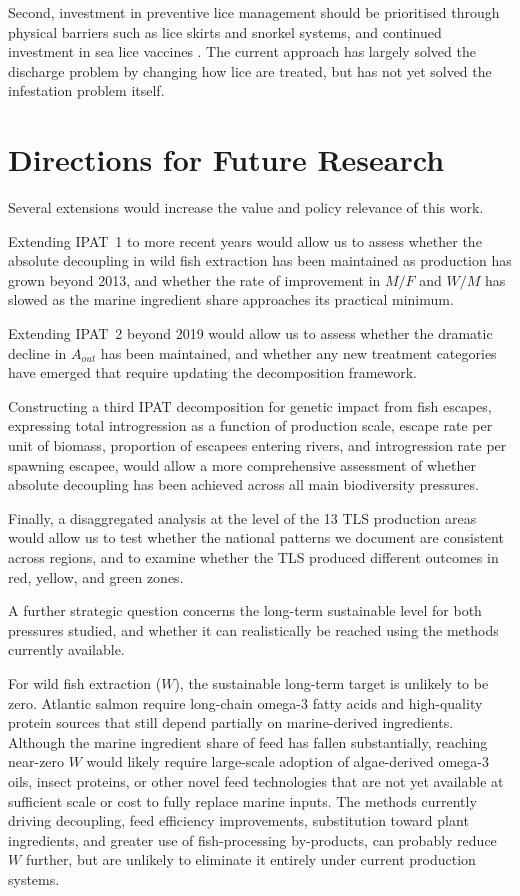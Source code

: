 \documentclass[12pt, a4paper]{report}
\begin{document}
Second, investment in preventive lice management should be prioritised through physical barriers such as lice skirts and snorkel systems, and continued investment in sea lice vaccines \citep{fishsite2024}. The current approach has largely solved the discharge problem by changing how lice are treated, but has not yet solved the infestation problem itself.

\section{Directions for Future Research}

Several extensions would increase the value and policy relevance of this work.

Extending IPAT~1 to more recent years would allow us to assess whether the absolute decoupling in wild fish extraction has been maintained as production has grown beyond 2013, and whether the rate of improvement in $M/F$ and $W/M$ has slowed as the marine ingredient share approaches its practical minimum.

Extending IPAT~2 beyond 2019 would allow us to assess whether the dramatic decline in $A_{out}$ has been maintained, and whether any new treatment categories have emerged that require updating the decomposition framework.

Constructing a third IPAT decomposition for genetic impact from fish escapes, expressing total introgression as a function of production scale, escape rate per unit of biomass, proportion of escapees entering rivers, and introgression rate per spawning escapee, would allow a more comprehensive assessment of whether absolute decoupling has been achieved across all main biodiversity pressures.

Finally, a disaggregated analysis at the level of the 13 TLS production areas would allow us to test whether the national patterns we document are consistent across regions, and to examine whether the TLS produced different outcomes in red, yellow, and green zones.

A further strategic question concerns the long-term sustainable level
for both pressures studied, and whether it can realistically be reached
using the methods currently available.

For wild fish extraction ($W$), the sustainable long-term target is
unlikely to be zero. Atlantic salmon require long-chain omega-3 fatty
acids and high-quality protein sources that still depend partially on
marine-derived ingredients. Although the marine ingredient share of feed
has fallen substantially, reaching near-zero $W$ would likely require
large-scale adoption of algae-derived omega-3 oils, insect proteins,
or other novel feed technologies that are not yet available at sufficient
scale or cost to fully replace marine inputs. The methods currently
driving decoupling, feed efficiency improvements, substitution toward
plant ingredients, and greater use of fish-processing by-products,
can probably reduce $W$ further, but are unlikely to eliminate it
entirely under current production systems.
\end{document}
